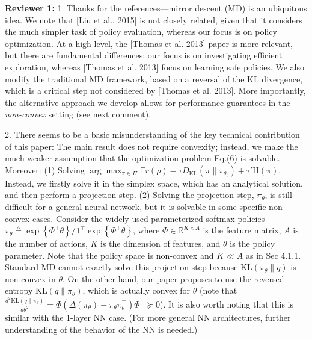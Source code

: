 \documentclass{article}
\begin{document}
{\bf Reviewer 1: }
1. 
Thanks for the references---mirror descent (MD) is an ubiquitous idea.
We note that [Liu et al., 2015] is not closely related,
given that it considers the much simpler task of policy evaluation,
whereas our focus is on policy optimization.
At a high level,
the [Thomas et al. 2013] paper is more relevant,
but there are fundamental differences:
our focus is on investigating efficient exploration,
whereas [Thomas et al. 2013] focus on learning safe policies.
We also modify the traditional MD framework,
based on a reversal of the KL divergence,
which is a critical step not considered by [Thomas et al. 2013].
More importantly, the alternative approach we develop allows for
performance guarantees in the \emph{non-convex} setting 
(see next comment).

2. There seems to be a basic misunderstanding of the key technical
contribution of this paper:
The main result does not require convexity;
instead, we make the much weaker assumption that the optimization 
problem Eq.(6) is solvable.
Moreover:
(1) Solving {\small $\arg\max_{\pi \in \Pi} \mathbb{E}r(\rho) - \tau D_{\text{KL}}(\pi \| \pi_{\theta_t}) + \tau' \text{H}(\pi)$}. Instead, we firstly solve it in the simplex space, which has an analytical solution, and then perform a projection step. 
(2) Solving the projection step, $\pi_\theta$, is still difficult for a 
general neural network, but it is solvable in some specific non-convex cases. 
Consider the widely used parameterized softmax policies 
{\small $\pi_{\theta} \triangleq 
\exp\left\{\Phi^\top\theta\right\}/
{{\mathbf{1}^\top \exp\left\{\Phi^\top\theta\right\}}}$}, 
where {\small $\Phi\in \mathbb{R}^{K\times A}$} is the feature matrix, 
$A$ is the number of actions, $K$ is the dimension of features, 
and $\theta$ is the policy parameter. 
Note that the policy space is non-convex and $K\ll A$ 
as in Sec 4.1.1. Standard MD cannot exactly solve this projection step 
because $\text{KL}(\pi_{\theta} \| q)$ is non-convex in $\theta$.
On the other hand, our paper proposes to use the reversed entropy
$\text{KL}(q \| \pi_{\theta})$, which is actually convex for $\theta$
(note that {\small $\frac{d^2 \text{KL}(q \| \pi_{\theta})}{d \theta^2} 
= \Phi (\Delta(\pi_\theta) - \pi_\theta \pi_\theta^\top) \Phi^\top \succeq 0$}). 
It is also worth noting that this is similar with the 1-layer NN case.
(For more general NN architectures, 
further understanding of the behavior of the NN is needed.)
\end{document}
